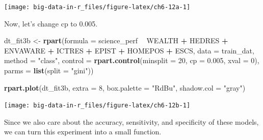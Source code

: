 \documentclass[]{book}
\newenvironment{Shaded}{\begin{snugshade}}{\end{snugshade}}
\newcommand{\DataTypeTok}[1]{\textcolor[rgb]{0.13,0.29,0.53}{#1}}
\newcommand{\DecValTok}[1]{\textcolor[rgb]{0.00,0.00,0.81}{#1}}
\newcommand{\FloatTok}[1]{\textcolor[rgb]{0.00,0.00,0.81}{#1}}
\newcommand{\KeywordTok}[1]{\textcolor[rgb]{0.13,0.29,0.53}{\textbf{#1}}}
\newcommand{\NormalTok}[1]{#1}
\newcommand{\OperatorTok}[1]{\textcolor[rgb]{0.81,0.36,0.00}{\textbf{#1}}}
\newcommand{\StringTok}[1]{\textcolor[rgb]{0.31,0.60,0.02}{#1}}
\begin{document}
\texttt{[image: big-data-in-r\_files/figure-latex/ch6-12a-1]}

Now, let's change cp to 0.005.

\begin{Shaded}
\begin{Highlighting}[]
\NormalTok{dt_fit3b <-}\StringTok{ }\KeywordTok{rpart}\NormalTok{(}\DataTypeTok{formula =}\NormalTok{ science_perf }\OperatorTok{~}\StringTok{ }\NormalTok{WEALTH }\OperatorTok{+}\StringTok{ }\NormalTok{HEDRES }\OperatorTok{+}\StringTok{ }\NormalTok{ENVAWARE }\OperatorTok{+}\StringTok{ }\NormalTok{ICTRES }\OperatorTok{+}\StringTok{ }\NormalTok{EPIST }\OperatorTok{+}\StringTok{ }
\StringTok{                   }\NormalTok{HOMEPOS }\OperatorTok{+}\StringTok{ }\NormalTok{ESCS,}
                 \DataTypeTok{data =}\NormalTok{ train_dat,}
                 \DataTypeTok{method =} \StringTok{"class"}\NormalTok{, }
                 \DataTypeTok{control =} \KeywordTok{rpart.control}\NormalTok{(}\DataTypeTok{minsplit =} \DecValTok{20}\NormalTok{, }
                                         \DataTypeTok{cp =} \FloatTok{0.005}\NormalTok{, }
                                         \DataTypeTok{xval =} \DecValTok{0}\NormalTok{),}
                \DataTypeTok{parms =} \KeywordTok{list}\NormalTok{(}\DataTypeTok{split =} \StringTok{"gini"}\NormalTok{))}

\KeywordTok{rpart.plot}\NormalTok{(dt_fit3b, }\DataTypeTok{extra =} \DecValTok{8}\NormalTok{, }\DataTypeTok{box.palette =} \StringTok{"RdBu"}\NormalTok{, }\DataTypeTok{shadow.col =} \StringTok{"gray"}\NormalTok{)}
\end{Highlighting}
\end{Shaded}

\texttt{[image: big-data-in-r\_files/figure-latex/ch6-12b-1]}

Since we also care about the accuracy, sensitivity, and specificity of these models, we can turn this experiment into a small function.
\end{document}
